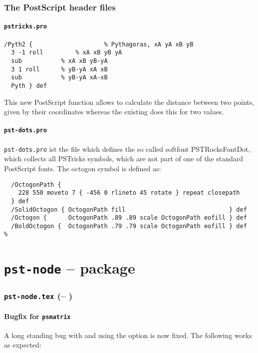 \documentclass[11pt]{article}
\begin{document}
\section{The PostScript header files}
\subsection{\texttt{pstricks.pro}}

\begin{verbatim}
/Pyth2 {					% Pythagoras, xA yA xB yB
  3 -1 roll 		% xA xB yB yA
  sub			% xA xB yB-yA
  3 1 roll 		% yB-yA xA xB
  sub			% yB-yA xA-xB
  Pyth } def
\end{verbatim}

This new PostScript function allows to calculate the distance
between two points, given by their coordinates whereas the
existing  does this for two values.

\subsection{\texttt{pst-dots.pro}}
\verb+pst-dots.pro+ ist the file which defines the so called softfont PSTRocksFontDot, which 
collects all PSTricks symbols, which are not part of one of the standard PostScript fonts.
The octogon symbol is defined as:
\begin{verbatim}
  /OctogonPath {
    228 550 moveto 7 { -456 0 rlineto 45 rotate } repeat closepath
  } def 
  /SolidOctogon { OctogonPath fill                             } def
  /Octogon {      OctogonPath .89 .89 scale OctogonPath eofill } def
  /BoldOctogon {  OctogonPath .79 .79 scale OctogonPath eofill } def
%
\end{verbatim}


\part{\texttt{pst-node} -- package}

\section{\texttt{pst-node.tex} (\NODEfileversion -- \NODEfiledate)}

\subsection{Bugfix for \texttt{psmatrix}}
A long standing bug with  and using the  option is now fixed.
The following works as expected:
\end{document}
